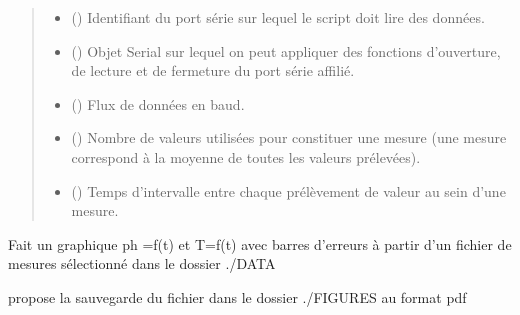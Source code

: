 \documentclass[letterpaper,10pt,french]{sphinxmanual}
\begin{document}
\begin{fulllineitems}
\begin{quote}
\begin{description}
\sphinxAtStartPar
\begin{itemize}
\item {} 
\sphinxAtStartPar
{} () \textendash{} Identifiant du port série sur lequel le script doit lire des données.

\item {} 
\sphinxAtStartPar
{} () \textendash{} Objet Serial sur lequel on peut appliquer des fonctions d’ouverture, de lecture et de fermeture du port série affilié.

\item {} 
\sphinxAtStartPar
{} () \textendash{} Flux de données en baud.

\item {} 
\sphinxAtStartPar
{} () \textendash{} Nombre de valeurs utilisées pour constituer une mesure (une mesure correspond à la moyenne de toutes les valeurs prélevées).

\item {} 
\sphinxAtStartPar
{} () \textendash{} Temps d’intervalle entre chaque prélèvement de valeur au sein d’une mesure.

\end{itemize}


\end{description}\end{quote}

\end{fulllineitems}


\begin{fulllineitems}
\label{\detokenize{library:lib_pH.graph}}
\pysigstartsignatures
\pysiglinewithargsret
{}
{}
{}
\pysigstopsignatures
\sphinxAtStartPar
Fait un graphique
ph =f(t) et T=f(t) avec barres d’erreurs
à partir d’un fichier de mesures
sélectionné dans le dossier ./DATA

\sphinxAtStartPar
propose la sauvegarde du fichier dans le dossier ./FIGURES au format pdf

\end{fulllineitems}
\end{document}
